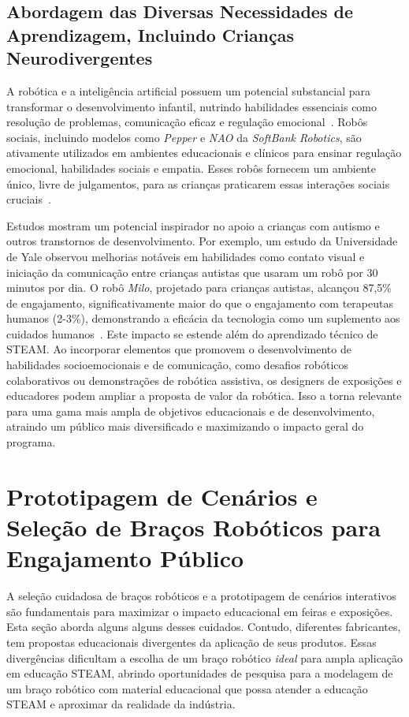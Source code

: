 \documentclass[%
  a4paper,%
  12pt,%
  fleqn,%
  english,%
  brazilian,%
]{article}
\begin{document}
\subsection{Abordagem das Diversas Necessidades de Aprendizagem, Incluindo Crianças Neurodivergentes}
\label{sec:neurodivergentes}
A robótica e a inteligência artificial possuem um potencial substancial para transformar o desenvolvimento infantil, nutrindo habilidades essenciais como resolução de problemas, comunicação eficaz e regulação emocional~\cite{behavioralHealthRoboticsAI2025}. Robôs sociais, incluindo modelos como \emph{Pepper} e \emph{NAO} da \textit{SoftBank Robotics}, são ativamente utilizados em ambientes educacionais e clínicos para ensinar regulação emocional, habilidades sociais e empatia. Esses robôs fornecem um ambiente único, livre de julgamentos, para as crianças praticarem essas interações sociais cruciais~\cite{behavioralHealthRoboticsAI2025}.

Estudos mostram um potencial inspirador no apoio a crianças com autismo e outros transtornos de desenvolvimento. Por exemplo, um estudo da Universidade de Yale observou melhorias notáveis em habilidades como contato visual e iniciação da comunicação entre crianças autistas que usaram um robô por 30 minutos por dia. O robô \emph{Milo}, projetado para crianças autistas, alcançou 87,5\% de engajamento, significativamente maior do que o engajamento com terapeutas humanos (2-3\%), demonstrando a eficácia da tecnologia como um suplemento aos cuidados humanos~\cite{behavioralHealthRoboticsAI2025}. Este impacto se estende além do aprendizado técnico de STEAM. Ao incorporar elementos que promovem o desenvolvimento de habilidades socioemocionais e de comunicação, como desafios robóticos colaborativos ou demonstrações de robótica assistiva, os designers de exposições e educadores podem ampliar a proposta de valor da robótica. Isso a torna relevante para uma gama mais ampla de objetivos educacionais e de desenvolvimento, atraindo um público mais diversificado e maximizando o impacto geral do programa.

\section{Prototipagem de Cenários e Seleção de Braços Robóticos para Engajamento Público}
A seleção cuidadosa de braços robóticos e a prototipagem de cenários interativos são fundamentais para maximizar o impacto educacional em feiras e exposições. Esta seção aborda alguns alguns desses cuidados. Contudo, diferentes fabricantes, tem propostas educacionais divergentes da aplicação de seus produtos. Essas divergências dificultam a escolha de um braço robótico \emph{ideal} para ampla aplicação em educação STEAM, abrindo oportunidades de pesquisa para a modelagem de um braço robótico com material educacional que possa atender a educação STEAM e aproximar da realidade da indústria.
\end{document}
